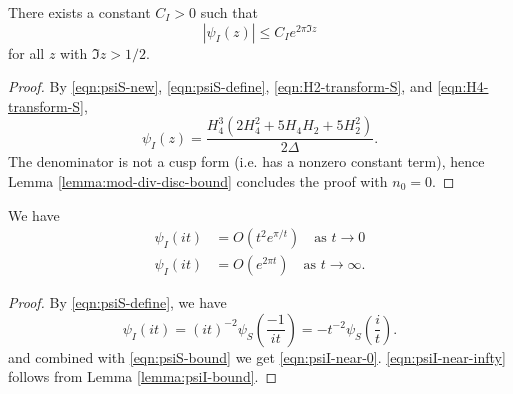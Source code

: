 \begin{lemma}\label{lemma:psiI-bound}
There exists a constant $C_I > 0$ such that
\begin{equation}
    |\psi_I(z)| \le C_I e^{2 \pi \Im z}
\end{equation}
for all $z$ with $\Im z > 1/2$.
\end{lemma}
\begin{proof}
By \eqref{eqn:psiS-new}, \eqref{eqn:psiS-define}, \eqref{eqn:H2-transform-S}, and \eqref{eqn:H4-transform-S},
\begin{equation}
    \psi_I(z) = \frac{H_4^3(2 H_4^2 + 5 H_4 H_2 + 5 H_2^2)}{2 \Delta}.
\end{equation}
The denominator is not a cusp form (i.e. has a nonzero constant term), hence Lemma \ref{lemma:mod-div-disc-bound} concludes the proof with $n_0 = 0$.
\end{proof}

\begin{corollary}\label{cor:psiI-near-0-infty}
We have
\begin{align}
    \psi_I(it) &= O(t^2 e^{\pi/t}) \quad \text{as } t \to 0 \label{eqn:psiI-near-0} \\
    \psi_I(it) &= O(e^{2 \pi t}) \quad \text{as } t \to \infty. \label{eqn:psiI-near-infty}
\end{align}
\end{corollary}
\begin{proof}
By \eqref{eqn:psiS-define}, we have
\begin{equation}
    \psi_I(it) = (it)^{-2} \psi_S\left(\frac{-1}{it}\right) = -t^{-2} \psi_S\left(\frac{i}{t}\right).
\end{equation}
and combined with \eqref{eqn:psiS-bound} we get \eqref{eqn:psiI-near-0}.
\eqref{eqn:psiI-near-infty} follows from Lemma \ref{lemma:psiI-bound}.
\end{proof}

